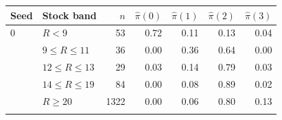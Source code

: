 \begin{tabular}{llrrrrr}
\toprule
Seed & Stock band & $n$ & $\hat\pi(0)$ & $\hat\pi(1)$ & $\hat\pi(2)$ & $\hat\pi(3)$ \\
\midrule
0 & $R<9$ & 53 & 0.72 & 0.11 & 0.13 & 0.04 \\
 & $9\le R\le 11$ & 36 & 0.00 & 0.36 & 0.64 & 0.00 \\
 & $12\le R\le 13$ & 29 & 0.03 & 0.14 & 0.79 & 0.03 \\
 & $14\le R\le 19$ & 84 & 0.00 & 0.08 & 0.89 & 0.02 \\
 & $R\ge 20$ & 1322 & 0.00 & 0.06 & 0.80 & 0.13 \\
\addlinespace
\bottomrule
\end{tabular}
